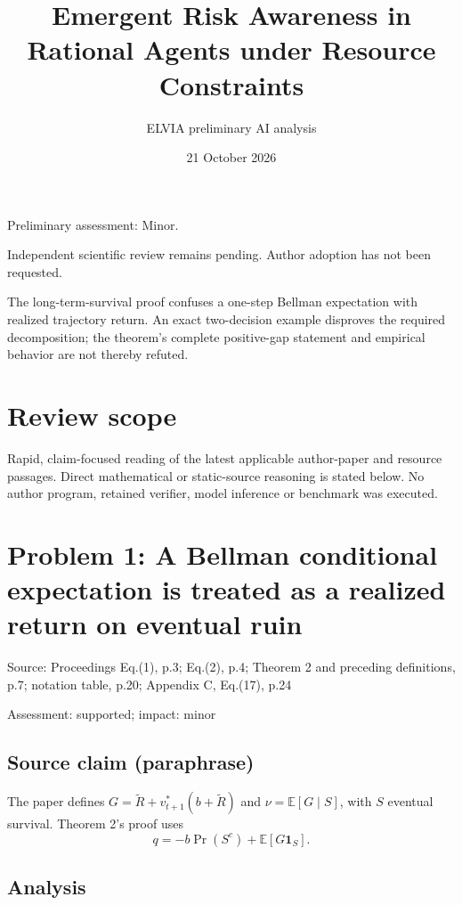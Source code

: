 \documentclass[11pt]{article}
\begin{document}
\title{Emergent Risk Awareness in Rational Agents under Resource Constraints}

\author{ELVIA preliminary AI analysis}\date{21 October 2026}\maketitle

Preliminary assessment: Minor.\par

Independent scientific review remains pending. Author adoption has not been requested.

The long-term-survival proof confuses a one-step Bellman expectation with realized trajectory return. An exact two-decision example disproves the required decomposition; the theorem’s complete positive-gap statement and empirical behavior are not thereby refuted.

\section*{Review scope}

Rapid, claim-focused reading of the latest applicable author-paper and resource passages. Direct mathematical or static-source reasoning is stated below. No author program, retained verifier, model inference or benchmark was executed.

\section*{Problem 1: A Bellman conditional expectation is treated as a realized return on eventual ruin}

Source: Proceedings Eq.(1), p.3; Eq.(2), p.4; Theorem 2 and preceding definitions, p.7; notation table, p.20; Appendix C, Eq.(17), p.24

Assessment: supported; impact: minor

\subsection*{Source claim (paraphrase)}

The paper defines \(G=\widetilde R+v^*_{t+1}(b+\widetilde R)\) and \(\nu=\mathbb E[G\mid S]\), with \(S\) eventual survival. Theorem 2’s proof uses \[q=-b\Pr(S^c)+\mathbb E[G\mathbf1_S].\]

\subsection*{Analysis}
\end{document}

